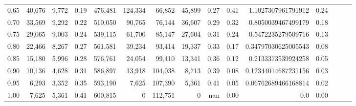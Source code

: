 \begin{tabular}{rrrrrrrrrrrrrrr}
0.65 &  40,676 &  9,772 &  0.19 &  476,481 &  124,334 &   66,852 &   45,899 &  0.27 &  0.41 &   1.1027307961791912 &      0.24 \\
0.70 &  33,569 &  9,292 &  0.22 &  510,050 &   90,765 &   76,144 &   36,607 &  0.29 &  0.32 &   0.8050039467499179 &      0.18 \\
0.75 &  29,065 &  9,003 &  0.24 &  539,115 &   61,700 &   85,147 &   27,604 &  0.31 &  0.24 &   0.5472235279509716 &      0.13 \\
0.80 &  22,466 &  8,267 &  0.27 &  561,581 &   39,234 &   93,414 &   19,337 &  0.33 &  0.17 &  0.34797030625005543 &      0.08 \\
0.85 &  15,180 &  5,996 &  0.28 &  576,761 &   24,054 &   99,410 &   13,341 &  0.36 &  0.12 &   0.2133373539924258 &      0.05 \\
0.90 &  10,136 &  4,628 &  0.31 &  586,897 &   13,918 &  104,038 &    8,713 &  0.39 &  0.08 &  0.12344014687231156 &      0.03 \\
0.95 &   6,293 &  3,352 &  0.35 &  593,190 &    7,625 &  107,390 &    5,361 &  0.41 &  0.05 &  0.06762689466168814 &      0.02 \\
1.00 &   7,625 &  5,361 &  0.41 &  600,815 &        0 &  112,751 &        0 &   nan &  0.00 &                  0.0 &      0.00 \\
\bottomrule
\end{tabular}
